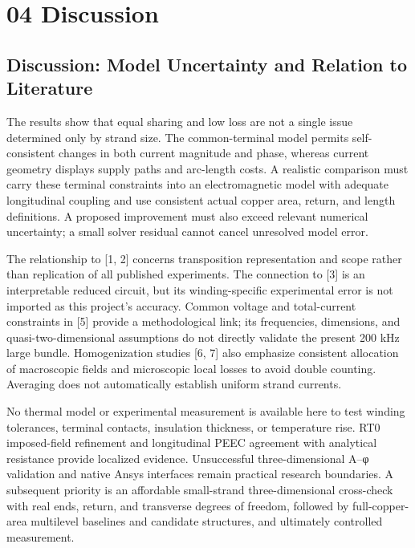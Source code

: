 \documentclass[journal,10pt]{IEEEtran}
\begin{document}
\section*{04 Discussion}
\hypertarget{chapter-04}{}
\subsection*{Discussion: Model Uncertainty and Relation to Literature}
\hypertarget{04.discussion.heading}{}
The results show that equal sharing and low loss are not a single issue determined only by strand size. The common-terminal model permits self-consistent changes in both current magnitude and phase, whereas current geometry displays supply paths and arc-length costs. A realistic comparison must carry these terminal constraints into an electromagnetic model with adequate longitudinal coupling and use consistent actual copper area, return, and length definitions. A proposed improvement must also exceed relevant numerical uncertainty; a small solver residual cannot cancel unresolved model error.


The relationship to [1, 2] concerns transposition representation and scope rather than replication of all published experiments. The connection to [3] is an interpretable reduced circuit, but its winding-specific experimental error is not imported as this project’s accuracy. Common voltage and total-current constraints in [5] provide a methodological link; its frequencies, dimensions, and quasi-two-dimensional assumptions do not directly validate the present 200 kHz large bundle. Homogenization studies [6, 7] also emphasize consistent allocation of macroscopic fields and microscopic local losses to avoid double counting. Averaging does not automatically establish uniform strand currents.


No thermal model or experimental measurement is available here to test winding tolerances, terminal contacts, insulation thickness, or temperature rise. RT0 imposed-field refinement and longitudinal PEEC agreement with analytical resistance provide localized evidence. Unsuccessful three-dimensional A–φ validation and native Ansys interfaces remain practical research boundaries. A subsequent priority is an affordable small-strand three-dimensional cross-check with real ends, return, and transverse degrees of freedom, followed by full-copper-area multilevel baselines and candidate structures, and ultimately controlled measurement.
\end{document}
